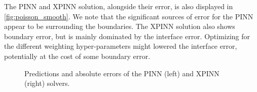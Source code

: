 The PINN and XPINN solution, alongside their error, is also displayed in \autoref{fig:poisson_smooth}.
We note that the significant sources of error for the PINN appear to be surrounding the boundaries.
The XPINN solution also shows boundary error, but is mainly dominated by the interface error.
Optimizing for the different weighting hyper-parameters might lowered the interface error, potentially at the cost of some boundary error.
\begin{figure}
\hfill
{}

\hfill
{}
\caption{Predictions and absolute errors of the PINN (left) and XPINN (right) solvers.}
\label{fig:poisson_smooth}
\end{figure}

